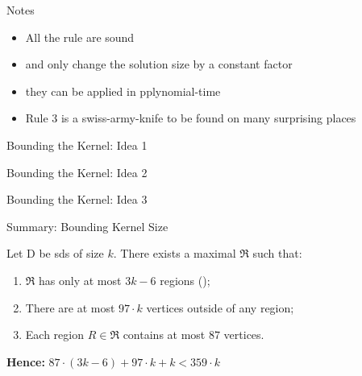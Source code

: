 \begin{frame}[c]{Notes}
    \begin{itemize}
        \item All the rule are sound 
        \item and only change the solution size by a constant factor
        \item they can be applied in pplynomial-time
        \item Rule 3 is a swiss-army-knife to be found on many surprising places
    \end{itemize}
\end{frame}

\begin{frame}[c]{Bounding the Kernel: Idea 1}
    \begin{figure}[!ht]
    \end{figure}
\end{frame}
\begin{frame}[c]{Bounding the Kernel: Idea 2}

    \begin{figure}[!ht]
    \end{figure}
\end{frame}
\begin{frame}[c]{Bounding the Kernel: Idea 3}

    \begin{figure}[!ht]
    \end{figure}
\end{frame}

\begin{frame}[c]{Summary: Bounding Kernel Size}

    Let D be sds of size $k$. There exists a maximal \dreg $\mathfrak{R}$ such that:

    \begin{enumerate}
        \item $\mathfrak{R}$ has only at most $3 k - 6$ regions (\cite{Alber2004});
        \item There are at most $97 \cdot k$ vertices outside of any region;
        \item Each region  $R \in \mathfrak{R}$ contains at most $87$ vertices.
    \end{enumerate}

    \textbf{Hence: } $87 \cdot (3k - 6) + 97 \cdot k + k < 359 \cdot k$

\end{frame}

